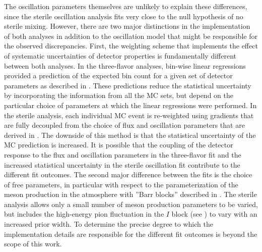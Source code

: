 The oscillation parameters themselves are unlikely to explain these differences, since the sterile oscillation analysis fits very close to the null hypothesis of no sterile mixing.
However, there are two major distinctions in the implementation of both analyses in addition to the oscillation model that might be responsible for the observed discrepancies.
First, the weighting scheme that implements the effect of systematic uncertainties of detector properties is fundamentally different between both analyses.
In the three-flavor analyses, bin-wise linear regressions provided a prediction of the expected bin count for a given set of detector parameters as described in .
These predictions reduce the statistical uncertainty by incorporating the information from all the MC sets, but depend on the particular choice of parameters at which the linear regressions were performed.
In the sterile analysis, each individual MC event is re-weighted using gradients that are fully decoupled from the choice of flux and oscillation parameters that are derived in .
The downside of this method is that the statistical uncertainty of the MC prediction is increased.
It is possible that the coupling of the detector response to the flux and oscillation parameters in the three-flavor fit and the increased statistical uncertainty in the sterile oscillation fit contribute to the different fit outcomes.
The second major difference between the fits is the choice of free parameters, in particular with respect to the parameterization of the meson production in the atmosphere with ''Barr blocks'' described in .
The sterile analysis allows only a small number of meson production parameters to be varied, but includes the high-energy pion fluctuation in the $I$ block (see ) to vary with an increased prior width.
 To determine the precise degree to which the implementation details are responsible for the different fit outcomes is beyond the scope of this work.

